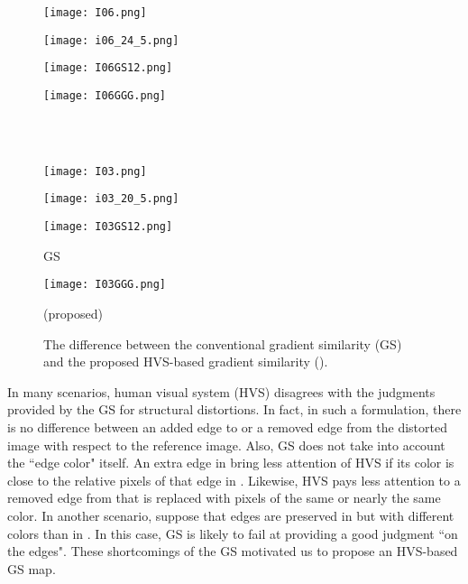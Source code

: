 \begin{figure*}[htb]
\scriptsize
\begin{minipage}[b]{0.245\linewidth}
  \centering
  \centerline{\texttt{[image: I06.png]}} 
\end{minipage}
\begin{minipage}[b]{0.245\linewidth}
  \centering
  \centerline{\texttt{[image: i06\_24\_5.png]}}
\end{minipage}
\begin{minipage}[b]{0.245\linewidth}
  \centering
  \centerline{\texttt{[image: I06GS12.png]}}
\end{minipage}
\begin{minipage}[b]{0.245\linewidth}
  \centering
  \centerline{\texttt{[image: I06GGG.png]}} 
\end{minipage}
\\ \\
\begin{minipage}[b]{0.245\linewidth}
  \centering
  \centerline{\texttt{[image: I03.png]}}
  \vspace{0.10cm}
\centerline{}
\end{minipage}
\begin{minipage}[b]{0.245\linewidth}
  \centering
  \centerline{\texttt{[image: i03\_20\_5.png]}}
  \vspace{0.10cm}
\centerline{}
\end{minipage}
\begin{minipage}[b]{0.245\linewidth}
  \centering
  \centerline{\texttt{[image: I03GS12.png]}}
  \vspace{0.10cm}
\centerline{GS}
\end{minipage}
\begin{minipage}[b]{0.245\linewidth}
  \centering
  \centerline{\texttt{[image: I03GGG.png]}}
  \vspace{0.10cm}
\centerline{ (proposed)}
\end{minipage}
\caption{The difference between the conventional gradient similarity (GS) and the proposed HVS-based gradient similarity ().}
\label{GShvs}
\end{figure*}




In many scenarios, human visual system (HVS) disagrees with the judgments provided by the GS for structural distortions. In fact, in such a formulation, there is no difference between an added edge to or a removed edge from the distorted image with respect to the reference image. Also, GS does not take into account the ``edge color" itself. An extra edge in  bring less attention of HVS if its color is close to the relative pixels of that edge in . Likewise, HVS pays less attention to a removed edge from  that is replaced with pixels of the same or nearly the same color. In another scenario, suppose that edges are preserved in  but with different colors than in . In this case, GS is likely to fail at providing a good judgment ``on the edges". These shortcomings of the GS motivated us to propose an HVS-based GS map. 



